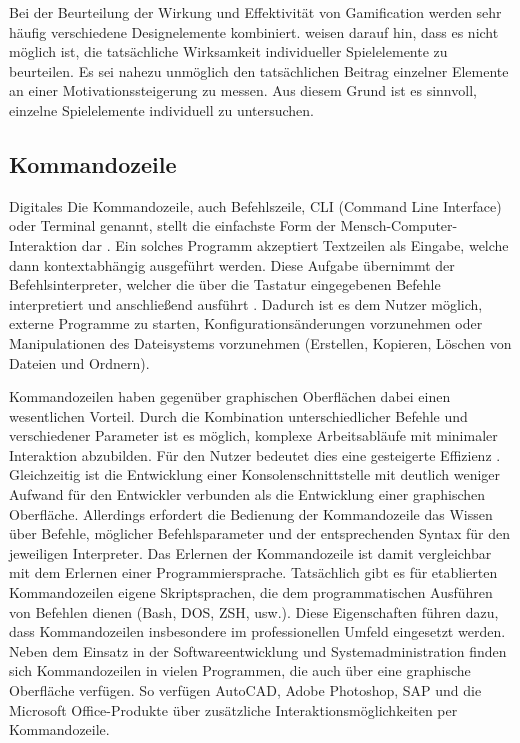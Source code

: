 Bei der Beurteilung der Wirkung und Effektivität von Gamification werden sehr häufig verschiedene Designelemente kombiniert. \citeauthor{mazarakis2018gamification} weisen darauf hin, dass es nicht möglich ist, die tatsächliche Wirksamkeit individueller Spielelemente zu beurteilen. Es sei nahezu unmöglich den tatsächlichen Beitrag einzelner Elemente an einer Motivationssteigerung zu messen. Aus diesem Grund ist es sinnvoll, einzelne Spielelemente individuell zu untersuchen.

\subsection{Kommandozeile}
Digitales 
Die Kommandozeile, auch Befehlszeile, CLI (Command Line Interface) oder Terminal genannt, stellt die einfachste Form der Mensch-Computer-Interaktion dar \cite{Kumar2005}. Ein solches Programm akzeptiert Textzeilen als Eingabe, welche dann kontextabhängig ausgeführt werden. Diese Aufgabe übernimmt der Befehlsinterpreter, welcher die über die Tastatur eingegebenen Befehle interpretiert und anschließend ausführt \cite{wissen_interpreter}. 
Dadurch ist es dem Nutzer möglich, externe Programme zu starten, Konfigurationsänderungen vorzunehmen oder Manipulationen des Dateisystems vorzunehmen (Erstellen, Kopieren, Löschen von Dateien und Ordnern).

Kommandozeilen haben gegenüber graphischen Oberflächen dabei einen wesentlichen Vorteil. Durch die Kombination unterschiedlicher Befehle und verschiedener Parameter ist es möglich, komplexe Arbeitsabläufe mit minimaler Interaktion abzubilden. Für den Nutzer bedeutet dies eine gesteigerte Effizienz \cite{Kumar2005}. Gleichzeitig ist die Entwicklung einer Konsolenschnittstelle mit deutlich weniger Aufwand für den Entwickler verbunden als die Entwicklung einer graphischen Oberfläche. Allerdings erfordert die Bedienung der Kommandozeile das Wissen über Befehle, möglicher Befehlsparameter und der entsprechenden Syntax für den jeweiligen Interpreter. Das Erlernen der Kommandozeile ist damit vergleichbar mit dem Erlernen einer Programmiersprache. Tatsächlich gibt es für etablierten Kommandozeilen eigene Skriptsprachen, die dem programmatischen Ausführen von Befehlen dienen (Bash, DOS, ZSH, usw.). Diese Eigenschaften führen dazu, dass Kommandozeilen insbesondere im professionellen Umfeld eingesetzt werden. Neben dem Einsatz in der Softwareentwicklung und Systemadministration finden sich Kommandozeilen in vielen Programmen, die auch über eine graphische Oberfläche verfügen. So verfügen AutoCAD, Adobe Photoshop, SAP und die Microsoft Office-Produkte über zusätzliche Interaktionsmöglichkeiten per Kommandozeile.



